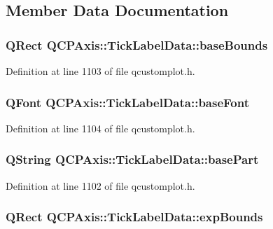 \subsection{Member Data Documentation}
\hypertarget{struct_q_c_p_axis_1_1_tick_label_data_a4613a53aca74ffe9436fdb584ef504fa}{
\subsubsection[{base\-Bounds}]{\setlength{\rightskip}{0pt plus 5cm}Q\-Rect Q\-C\-P\-Axis\-::\-Tick\-Label\-Data\-::base\-Bounds}}\label{struct_q_c_p_axis_1_1_tick_label_data_a4613a53aca74ffe9436fdb584ef504fa}


Definition at line 1103 of file qcustomplot.\-h.

\hypertarget{struct_q_c_p_axis_1_1_tick_label_data_a2d8cb87e8644af7971f46da2cd28fc4e}{
\subsubsection[{base\-Font}]{\setlength{\rightskip}{0pt plus 5cm}Q\-Font Q\-C\-P\-Axis\-::\-Tick\-Label\-Data\-::base\-Font}}\label{struct_q_c_p_axis_1_1_tick_label_data_a2d8cb87e8644af7971f46da2cd28fc4e}


Definition at line 1104 of file qcustomplot.\-h.

\hypertarget{struct_q_c_p_axis_1_1_tick_label_data_a90d8d1e5d4706518e6b9e30371bf0346}{
\subsubsection[{base\-Part}]{\setlength{\rightskip}{0pt plus 5cm}Q\-String Q\-C\-P\-Axis\-::\-Tick\-Label\-Data\-::base\-Part}}\label{struct_q_c_p_axis_1_1_tick_label_data_a90d8d1e5d4706518e6b9e30371bf0346}


Definition at line 1102 of file qcustomplot.\-h.

\hypertarget{struct_q_c_p_axis_1_1_tick_label_data_a7207967211d6f6be4471b7fe746f40c5}{
\subsubsection[{exp\-Bounds}]{\setlength{\rightskip}{0pt plus 5cm}Q\-Rect Q\-C\-P\-Axis\-::\-Tick\-Label\-Data\-::exp\-Bounds}}\label{struct_q_c_p_axis_1_1_tick_label_data_a7207967211d6f6be4471b7fe746f40c5}


